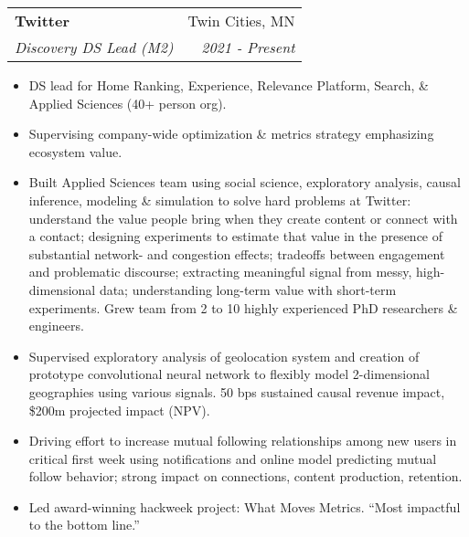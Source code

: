 \documentclass[letterpaper,11pt]{article}
\makeatletter
\newcommand{\resitem}[1]{\item #1 \vspace{-6pt}}
\newcommand{\ressubheading}[4]{\vspace{2pt}
\begin{tabular*}{7.58in}{l@{\extracolsep{\fill}}r}
		\textbf{#1} & #2 \\
		\textit{#3} & \textit{#4} \\
\end{tabular*}\vspace{-1pt}}
\makeatother
\begin{document}
\ressubheading{Twitter}{Twin Cities, MN}{Discovery DS Lead (M2)}{2021 - Present}
	\begin{itemize}
		\resitem{DS lead for Home Ranking, Experience, Relevance Platform, Search, \& Applied Sciences (40+ person org).} 
		\resitem{Supervising company-wide optimization \& metrics strategy emphasizing ecosystem value.} 
       	 	\resitem{Built Applied Sciences team using social science, exploratory analysis, causal inference, modeling \& simulation to solve hard problems at Twitter: understand the value people bring when they create content or connect with a contact; designing experiments to estimate that value in the presence of substantial network- and congestion effects; tradeoffs between engagement and problematic discourse; extracting meaningful signal from messy, high-dimensional data; understanding long-term value with short-term experiments. Grew team from 2 to 10 highly experienced PhD researchers \& engineers.}
		\resitem{Supervised exploratory analysis of geolocation system and creation of prototype convolutional neural network to flexibly model 2-dimensional geographies using various signals. 50 bps sustained causal revenue impact, \$200m projected impact (NPV).} 
		\resitem{Driving effort to increase mutual following relationships among new users in critical first week using notifications and online model predicting mutual follow behavior; strong impact on connections, content production, retention.} 
		\resitem{Led award-winning hackweek project: What Moves Metrics. ``Most impactful to the bottom line.''} 
	\end{itemize}
\end{document}
